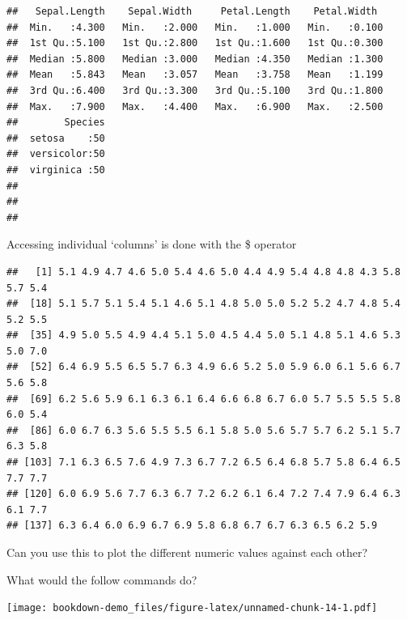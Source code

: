 \documentclass[]{book}
\newenvironment{Shaded}{\begin{snugshade}}{\end{snugshade}}
\newcommand{\KeywordTok}[1]{\textcolor[rgb]{0.13,0.29,0.53}{\textbf{#1}}}
\newcommand{\OperatorTok}[1]{\textcolor[rgb]{0.81,0.36,0.00}{\textbf{#1}}}
\newcommand{\NormalTok}[1]{#1}
\theoremstyle{definition}
\theoremstyle{definition}
\theoremstyle{definition}
\theoremstyle{remark}
\begin{document}
\begin{verbatim}
##   Sepal.Length    Sepal.Width     Petal.Length    Petal.Width   
##  Min.   :4.300   Min.   :2.000   Min.   :1.000   Min.   :0.100  
##  1st Qu.:5.100   1st Qu.:2.800   1st Qu.:1.600   1st Qu.:0.300  
##  Median :5.800   Median :3.000   Median :4.350   Median :1.300  
##  Mean   :5.843   Mean   :3.057   Mean   :3.758   Mean   :1.199  
##  3rd Qu.:6.400   3rd Qu.:3.300   3rd Qu.:5.100   3rd Qu.:1.800  
##  Max.   :7.900   Max.   :4.400   Max.   :6.900   Max.   :2.500  
##        Species  
##  setosa    :50  
##  versicolor:50  
##  virginica :50  
##                 
##                 
## 
\end{verbatim}

Accessing individual `columns' is done with the \$ operator

\begin{Shaded}
\end{Shaded}

\begin{verbatim}
##   [1] 5.1 4.9 4.7 4.6 5.0 5.4 4.6 5.0 4.4 4.9 5.4 4.8 4.8 4.3 5.8 5.7 5.4
##  [18] 5.1 5.7 5.1 5.4 5.1 4.6 5.1 4.8 5.0 5.0 5.2 5.2 4.7 4.8 5.4 5.2 5.5
##  [35] 4.9 5.0 5.5 4.9 4.4 5.1 5.0 4.5 4.4 5.0 5.1 4.8 5.1 4.6 5.3 5.0 7.0
##  [52] 6.4 6.9 5.5 6.5 5.7 6.3 4.9 6.6 5.2 5.0 5.9 6.0 6.1 5.6 6.7 5.6 5.8
##  [69] 6.2 5.6 5.9 6.1 6.3 6.1 6.4 6.6 6.8 6.7 6.0 5.7 5.5 5.5 5.8 6.0 5.4
##  [86] 6.0 6.7 6.3 5.6 5.5 5.5 6.1 5.8 5.0 5.6 5.7 5.7 6.2 5.1 5.7 6.3 5.8
## [103] 7.1 6.3 6.5 7.6 4.9 7.3 6.7 7.2 6.5 6.4 6.8 5.7 5.8 6.4 6.5 7.7 7.7
## [120] 6.0 6.9 5.6 7.7 6.3 6.7 7.2 6.2 6.1 6.4 7.2 7.4 7.9 6.4 6.3 6.1 7.7
## [137] 6.3 6.4 6.0 6.9 6.7 6.9 5.8 6.8 6.7 6.7 6.3 6.5 6.2 5.9
\end{verbatim}

Can you use this to plot the different numeric values against each
other?

What would the follow commands do?

\begin{Shaded}
\end{Shaded}

\texttt{[image: bookdown-demo\_files/figure-latex/unnamed-chunk-14-1.pdf]}
\end{document}
